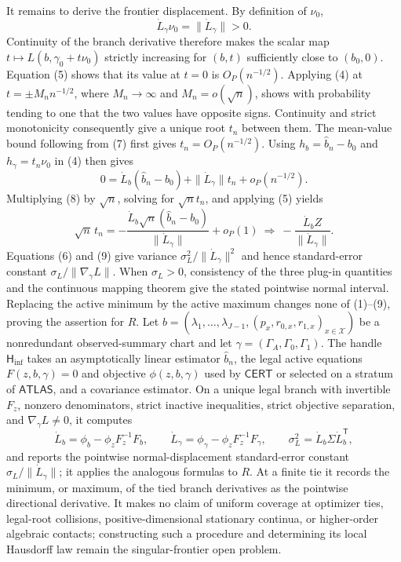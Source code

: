 It remains to derive the frontier displacement.  By definition of \(\nu_0\),
\[
\dot L_\gamma\nu_0=\|\dot L_\gamma\|>0.
\tag{7}
\]
Continuity of the branch derivative therefore makes the scalar map \(t\mapsto L(b,\gamma_0+t\nu_0)\) strictly increasing for \((b,t)\) sufficiently close to \((b_0,0)\).  Equation (5) shows that its value at \(t=0\) is \(O_P(n^{-1/2})\).  Applying (4) at \(t=\pm M_n n^{-1/2}\), where \(M_n\to\infty\) and \(M_n=o(\sqrt n)\), shows with probability tending to one that the two values have opposite signs.  Continuity and strict monotonicity consequently give a unique root \(t_n\) between them.  The mean-value bound following from (7) first gives \(t_n=O_P(n^{-1/2})\).  Using \(h_b=\widehat b_n-b_0\) and \(h_\gamma=t_n\nu_0\) in (4) then gives
\[
0=\dot L_b(\widehat b_n-b_0)+\|\dot L_\gamma\|t_n+o_P(n^{-1/2}).
\tag{8}
\]
Multiplying (8) by \(\sqrt n\), solving for \(\sqrt n t_n\), and applying (5) yields
\[
\sqrt n\,t_n
=-\frac{\dot L_b\sqrt n(\widehat b_n-b_0)}{\|\dot L_\gamma\|}+o_P(1)
\ \Longrightarrow\
-\frac{\dot L_bZ}{\|\dot L_\gamma\|}.
\tag{9}
\]
Equations (6) and (9) give variance \(\sigma_L^2/\|\dot L_\gamma\|^2\) and hence standard-error constant \(\sigma_L/\|\nabla_\gamma L\|\).  When \(\sigma_L>0\), consistency of the three plug-in quantities and the continuous mapping theorem give the stated pointwise normal interval.  Replacing the active minimum by the active maximum changes none of (1)--(9), proving the assertion for \(R\).
Let \(b=(\lambda_1,\ldots,\lambda_{J-1},(p_x,r_{0,x},r_{1,x})_{x\in\mathcal X})\) be a nonredundant observed-summary chart and let \(\gamma=(\Gamma_A,\Gamma_0,\Gamma_1)\).  The handle \(\mathsf H_{\mathrm{inf}}\) takes an asymptotically linear estimator \(\widehat b_n\), the legal active equations \(F(z,b,\gamma)=0\) and objective \(\phi(z,b,\gamma)\) used by \(\mathsf{CERT}\) or selected on a stratum of \(\mathsf{ATLAS}\), and a covariance estimator.  On a unique legal branch with invertible \(F_z\), nonzero denominators, strict inactive inequalities, strict objective separation, and \(\nabla_\gamma L\neq0\), it computes
\[
\dot L_b=\phi_b-\phi_zF_z^{-1}F_b,
\qquad
\dot L_\gamma=\phi_\gamma-\phi_zF_z^{-1}F_\gamma,
\qquad
\sigma_L^2=\dot L_b\Sigma\dot L_b^{\mathsf T},
\]
and reports the pointwise normal-displacement standard-error constant \(\sigma_L/\|\dot L_\gamma\|\); it applies the analogous formulas to \(R\).  At a finite tie it records the minimum, or maximum, of the tied branch derivatives as the pointwise directional derivative.  It makes no claim of uniform coverage at optimizer ties, legal-root collisions, positive-dimensional stationary continua, or higher-order algebraic contacts; constructing such a procedure and determining its local Hausdorff law remain the singular-frontier open problem.
